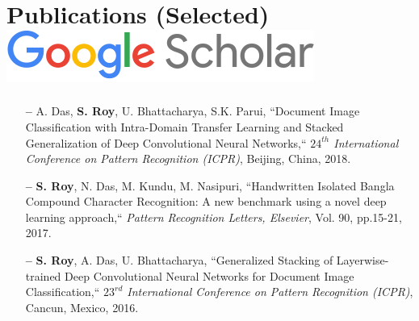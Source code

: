 \section{Publications (Selected)  \hfill { \small \href{https://scholar.google.de/citations?user=dSs0DfoAAAAJ&hl=en}{\includegraphics[scale=0.15]{scholar_logo_64dp.png}}}}
\begin{itemize}[leftmargin=10pt]
    \item[\textbf{--}] A. Das, \textbf{S. Roy}, U. Bhattacharya, S.K. Parui, ``Document Image Classification with Intra-Domain Transfer Learning and Stacked Generalization of Deep Convolutional Neural Networks,`` \textit{$24^{th}$ International Conference on Pattern Recognition (ICPR)}, Beijing, China, 2018.
    \item[\textbf{--}] \textbf{S. Roy}, N. Das, M. Kundu, M. Nasipuri, ``Handwritten Isolated Bangla Compound Character Recognition: A new benchmark using a novel deep learning approach,`` \textit{Pattern Recognition Letters, Elsevier}, Vol. 90, pp.15-21, 2017.
    \item[\textbf{--}] \textbf{S. Roy}, A. Das, U. Bhattacharya, ``Generalized Stacking of Layerwise-trained Deep Convolutional Neural Networks for Document Image Classification,`` \textit{$23^{rd}$ International Conference on Pattern Recognition (ICPR)}, Cancun, Mexico, 2016.
\end{itemize}
